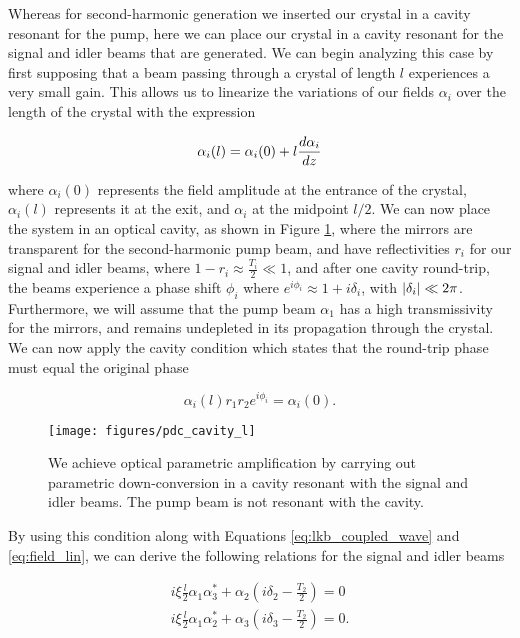 Whereas for second-harmonic generation we inserted our crystal in a cavity
resonant for the pump, here we can place our crystal in a cavity resonant for
the signal and idler beams that are generated.  We can begin analyzing this
case by first supposing that a beam passing through a crystal of length $l$ experiences a very small gain.  This allows us to linearize the variations of our fields $\alpha_i$ over the length of the crystal with the expression \cite{fabre1989noise} 

\begin{equation}
  \label{eq:field_lin}
  \alpha_i(l) = \alpha_i(0) + l \frac{d \alpha_i}{d z}
\end{equation}

\noindent
where $\alpha_i(0)$ represents the field amplitude at the entrance of the crystal, $\alpha_i(l)$ represents it at the exit, and $\alpha_i$ at the midpoint $l/2$.  We can now place the system in an optical cavity, as shown in Figure \ref{fig:pdc_cavity},  where the mirrors are transparent for the second-harmonic pump beam, and have reflectivities $r_i$ for our signal and idler beams, where $1-r_i \approx \frac{T_i}{2} \ll 1$, and after one cavity round-trip, the beams experience a phase shift $\phi_i$ where $e^{i \phi_i} \approx 1 + i \delta_i$, with $\left| \delta_i \right| \ll 2\pi$.  Furthermore, we will assume that the pump beam $\alpha_1$ has a high transmissivity for the mirrors, and remains undepleted in its propagation through the crystal.  We can now apply the cavity condition which states that the round-trip phase must equal the original phase

\begin{equation}
  \label{eq:cavity_cond}
  \alpha_i(l) r_1 r_2 e^{i \phi_i} = \alpha_i(0) .
\end{equation}

\begin{figure}[ht] 
 \centering 
 \texttt{[image: figures/pdc\_cavity\_l]} 
 \caption[Optical parametric amplification]{We achieve optical parametric amplification by carrying out parametric down-conversion in a cavity resonant with the signal and idler beams.  The pump beam is not resonant with the cavity.} 
 \label{fig:pdc_cavity} 
\end{figure}

\noindent
By using this condition along with Equations \ref{eq:lkb_coupled_wave} and \ref{eq:field_lin}, we can derive the following relations for the signal and idler beams \cite{joffre}

\begin{eqnarray}
  \label{eq:cav_pdc}
  i \xi \frac{l}{2} \alpha_1 \alpha^*_3 + \alpha_2  (i \delta_2 - \frac{T_2}{2}) = 0 \\
  i \xi \frac{l}{2} \alpha_1 \alpha^*_2 + \alpha_3  (i \delta_3 -
\frac{T_2}{2}) = 0  .
\end{eqnarray}

